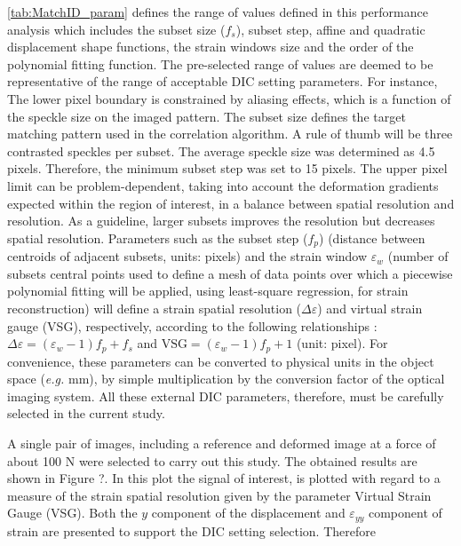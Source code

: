 \ref{tab:MatchID_param} defines the range of values defined in this performance analysis which includes the subset size ($f_s$), subset step, affine and quadratic displacement shape functions, the strain windows size and the order of the polynomial fitting function. The pre-selected range of values are deemed to be representative of the range of acceptable DIC setting parameters. For instance, The lower pixel boundary is constrained by aliasing effects, which is a function of the speckle size on the imaged pattern. The subset size defines the target matching pattern used in the correlation algorithm. A rule of thumb will be three contrasted speckles per subset. The average speckle size was determined as 4.5 pixels. Therefore, the minimum subset step was set to 15 pixels. The upper pixel limit can be problem-dependent, taking into account the deformation gradients expected within the region of interest, in a balance between spatial resolution and resolution. As a guideline, larger subsets improves the resolution but decreases spatial resolution. Parameters such as the subset step ($f_p$) (distance between centroids of adjacent subsets, units: pixels) and the strain window $\varepsilon_w$ (number of subsets central points used to define a mesh of data points over which a piecewise polynomial fitting will be applied, using least-square regression, for strain reconstruction) will define a strain spatial resolution ($\Delta \varepsilon$) and virtual strain gauge (VSG), respectively, according to the following relationships \cite{Lava2013576,Pereira2018566}: $\Delta \varepsilon = (\varepsilon_w-1)f_p + f_s$ and $\mbox{VSG} = (\varepsilon_w-1)f_p + 1$ (unit: pixel). For convenience, these parameters can be converted to physical units in the object space (\textit{e.g.} mm), by simple multiplication by the conversion factor of the optical imaging system. All these external DIC parameters, therefore, must be carefully selected in the current study.


A single pair of images, including a reference and deformed image at a force of about 100 N were selected to carry out this study. The obtained results are shown in Figure ?. In this plot the signal of interest, is plotted with regard to a measure of the strain spatial resolution given by the parameter Virtual Strain Gauge (VSG). Both the $y$ component of the displacement and $\varepsilon_{yy}$ component of strain are presented to support the DIC setting selection. Therefore
